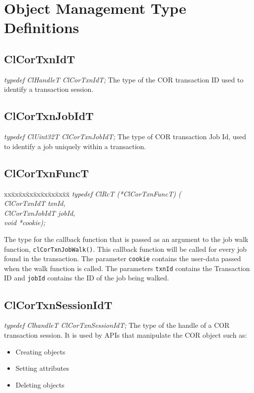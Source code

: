 \begin{flushleft}
\begin{CompactItemize}
\end{CompactItemize}

\newpage
\section{Object Management Type Definitions}
\subsection{ClCorTxnIdT}
\textit{typedef ClHandleT       ClCorTxnIdT;}
\newline
\newline
The type of the COR transaction ID used to identify a transaction session. 

\subsection{ClCorTxnJobIdT}
\textit{typedef ClUint32T       ClCorTxnJobIdT;}
\newline
\newline
The type of COR transaction Job Id, used to identify a job uniquely within a transaction.

\subsection{ClCorTxnFuncT}
\begin{tabbing}
xx\=xx\=xx\=xx\=xx\=xx\=xx\=xx\=xx\=\kill
\textit{typedef ClRcT  (*ClCorTxnFuncT) (}\\
\>\>\>\>\textit{ClCorTxnIdT  txnId,}\\
\>\>\>\>\textit{ClCorTxnJobIdT jobId,}\\
\>\>\>\>\textit{void *cookie);}\\
\end{tabbing}
The type for the callback function that is passed as an argument to the job walk function, {\tt{clCorTxnJobWalk()}}. This callback function will be 
called for every job found in the transaction. The parameter {\tt{cookie}} contains the user-data passed when the walk function is called. The parameters
{\tt{txnId}} contains the Transaction ID and {\tt{jobId}} contains the ID of the job being walked.




\subsection{ClCorTxnSessionIdT}
\textit{typedef ClhandleT ClCorTxnSessionIdT;}
\newline
\newline
The type of the handle of a COR transaction session. It is used by APIs that manipulate the COR object such as:
\begin{itemize}
\item
Creating objects
\item
Setting attributes
\item
Deleting objects
\end{itemize}



\end{flushleft}
